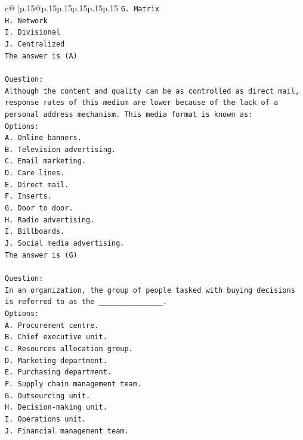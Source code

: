 \documentclass{article}
\begin{document}
{\begin{supertabular}{c@{$\;$}|p{.15\linewidth}@{}p{.15\linewidth}p{.15\linewidth}p{.15\linewidth}p{.15\linewidth}p{.15\linewidth}}
{{{\texttt{G. Matrix} \\
\texttt{H. Network} \\
\texttt{I. Divisional} \\
\texttt{J. Centralized} \\
\texttt{The answer is (A)} \\
\\ 
\texttt{Question:} \\
\texttt{Although the content and quality can be as controlled as direct mail, response rates of this medium are lower because of the lack of a personal address mechanism. This media format is known as:} \\
\texttt{Options:} \\
\texttt{A. Online banners.} \\
\texttt{B. Television advertising.} \\
\texttt{C. Email marketing.} \\
\texttt{D. Care lines.} \\
\texttt{E. Direct mail.} \\
\texttt{F. Inserts.} \\
\texttt{G. Door to door.} \\
\texttt{H. Radio advertising.} \\
\texttt{I. Billboards.} \\
\texttt{J. Social media advertising.} \\
\texttt{The answer is (G)} \\
\\ 
\texttt{Question:} \\
\texttt{In an organization, the group of people tasked with buying decisions is referred to as the \_\_\_\_\_\_\_\_\_\_\_\_\_\_\_.} \\
\texttt{Options:} \\
\texttt{A. Procurement centre.} \\
\texttt{B. Chief executive unit.} \\
\texttt{C. Resources allocation group.} \\
\texttt{D. Marketing department.} \\
\texttt{E. Purchasing department.} \\
\texttt{F. Supply chain management team.} \\
\texttt{G. Outsourcing unit.} \\
\texttt{H. Decision{-}making unit.} \\
\texttt{I. Operations unit.} \\
\texttt{J. Financial management team.} \\
}}}
\end{supertabular}}
\end{document}
